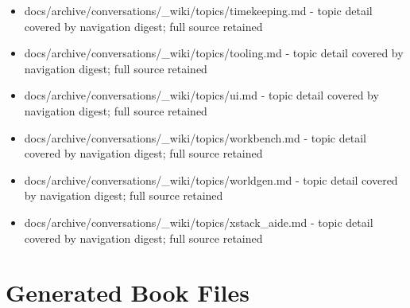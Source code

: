 \documentclass[11pt,a4paper]{report}
\begin{document}
\begin{itemize}
\item docs/archive/conversations/\_wiki/topics/timekeeping.md - topic detail covered by navigation digest; full source retained
\item docs/archive/conversations/\_wiki/topics/tooling.md - topic detail covered by navigation digest; full source retained
\item docs/archive/conversations/\_wiki/topics/ui.md - topic detail covered by navigation digest; full source retained
\item docs/archive/conversations/\_wiki/topics/workbench.md - topic detail covered by navigation digest; full source retained
\item docs/archive/conversations/\_wiki/topics/worldgen.md - topic detail covered by navigation digest; full source retained
\item docs/archive/conversations/\_wiki/topics/xstack\_aide.md - topic detail covered by navigation digest; full source retained
\end{itemize}

\section{Generated Book Files}
\end{document}
